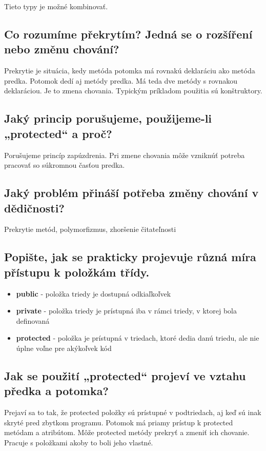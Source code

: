 Tieto typy je možné kombinovať.

\subsection{Co rozumíme překrytím? Jedná se o rozšíření nebo změnu chování?}
Prekrytie je situácia, kedy metóda potomka má rovnakú deklaráciu ako metóda predka. Potomok dedí aj metódy predka. Má teda dve metódy s rovnakou deklaráciou. Je to zmena chovania. Typickým príkladom použitia sú konštruktory.

\subsection{Jaký princip porušujeme, použijeme-li „protected“ a proč?}
Porušujeme princíp zapúzdrenia. Pri zmene chovania môže vzniknúť potreba pracovať so súkromnou časťou predka.

\subsection{Jaký problém přináší potřeba změny chování v dědičnosti?}
Prekrytie metód, polymorfizmus, zhoršenie čitateľnosti

\subsection{Popište, jak se prakticky projevuje různá míra přístupu k položkám třídy.}
\begin{itemize}
    \item \textbf{public} - položka triedy je dostupná odkiaľkoľvek
    \item \textbf{private} - položka triedy je prístupná iba v rámci triedy, v ktorej bola definovaná
    \item \textbf{protected} - položka je prístupná v triedach, ktoré dedia danú triedu, ale nie úplne voľne pre akýkoľvek kód
\end{itemize}

\subsection{Jak se použití „protected“ projeví ve vztahu předka a potomka?}
Prejaví sa to tak, že protected položky sú prístupné v podtriedach, aj keď sú inak skryté pred zbytkom programu. Potomok má priamy prístup k protected metódam a atribútom. Môže protected metódy prekryť a zmeniť ich chovanie. Pracuje s položkami akoby to boli jeho vlastné.